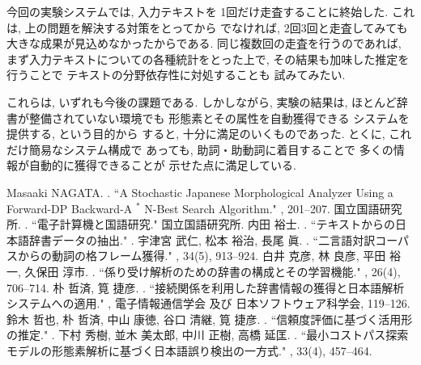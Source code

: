今回の実験システムでは, 入力テキストを
1回だけ走査することに終始した. 
これは, 上の問題を解決する対策をとってから
でなければ, 2回3回と走査してみても
大きな成果が見込めなかったからである.
同じ複数回の走査を行うのであれば, 
まず入力テキストについての各種統計をとった上で, 
その結果も加味した推定を行うことで
テキストの分野依存性に対処することも
試みてみたい.  

これらは, いずれも今後の課題である. 
しかしながら, 実験の結果は, 
ほとんど辞書が整備されていない環境でも
形態素とその属性を自動獲得できる
システムを提供する, という目的から
すると, 十分に満足のいくものであった. 
とくに, これだけ簡易なシステム構成で
あっても, 助詞・助動詞に着目することで
多くの情報が自動的に獲得できることが
示せた点に満足している. 


\begin{thebibliography}{10}

Masaaki NAGATA. \BBCP. 
\newblock ``A Stochastic Japanese Morphological Analyzer 
  Using a Forward-DP Backward-A $^{\ast}$ N-Best Search Algorithm."
, 201--207.
国立国語研究所. \BBCP.  
\newblock  ``電子計算機と国語研究." 
\newblock 国立国語研究所.
内田  裕士. \BBCP. 
\newblock ``テキストからの日本語辞書データの抽出."
.
宇津宮 武仁, 松本 裕治, 長尾 眞. \BBCP.
\newblock ``二言語対訳コーパスからの動詞の格フレーム獲得."
, 34(5), 913--924.
白井 克彦, 林 良彦, 平田 裕一, 久保田 淳市. \BBCP.
\newblock ``係り受け解析のための辞書の構成とその学習機能."
, 26(4), 706--714.
朴  哲済, 筧  捷彦. \BBCP.  
\newblock ``接続関係を利用した辞書情報の獲得と日本語解析システムへの適用."
, 
 電子情報通信学会 及び 日本ソフトウェア科学会, 119--126.
鈴木  哲也, 朴  哲済, 中山  康徳, 谷口  清継, 筧  捷彦. \BBCP.
\newblock ``信頼度評価に基づく活用形の推定."
.
下村 秀樹, 並木 美太郎, 中川 正樹, 高橋 延匡. \BBCP.
\newblock ``最小コストパス探索モデルの形態素解析に基づく日本語誤り検出の一方式."
, 33(4), 457--464.
\end{thebibliography}

